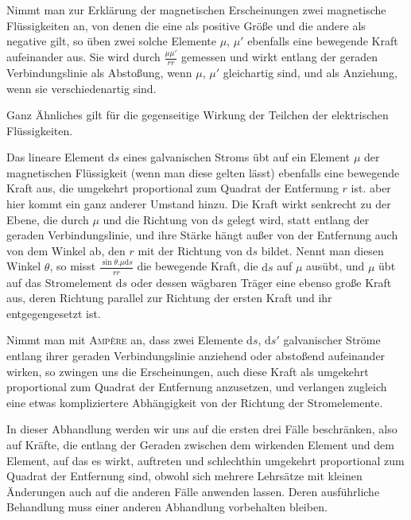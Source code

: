 Nimmt man zur Erklärung der magnetischen Erscheinungen zwei magnetische Flüssigkeiten an, von denen die eine als positive Größe und die andere als negative gilt, so üben zwei solche Elemente $\mu$, $\mu'$ ebenfalls eine bewegende Kraft aufeinander aus. Sie wird durch $\frac{\mu\mu'}{rr}$ gemessen und wirkt entlang der geraden Verbindungslinie als Abstoßung, wenn $\mu$, $\mu'$ gleichartig sind, und als Anziehung, wenn sie verschiedenartig sind.

Ganz Ähnliches gilt für die gegenseitige Wirkung der Teilchen der elektrischen Flüssigkeiten.

Das lineare Element $\mathrm{d}s$ eines galvanischen Stroms übt auf ein Element $\mu$ der magnetischen Flüssigkeit (wenn man diese gelten lässt) ebenfalls eine bewegende Kraft aus, die umgekehrt proportional zum Quadrat der Entfernung $r$ ist. aber hier kommt ein ganz anderer Umstand hinzu. Die Kraft wirkt senkrecht zu der Ebene, die durch $\mu$ und die Richtung von $\mathrm{d}s$ gelegt wird, statt entlang der geraden Verbindungslinie, und ihre Stärke hängt außer von der Entfernung auch von dem Winkel ab, den $r$ mit der Richtung von $\mathrm{d}s$ bildet. Nennt man diesen Winkel $\theta$, so misst $\frac{\sin\theta.\mu\mathrm{d}s}{rr}$ die bewegende Kraft, die $\mathrm{d}s$ auf $\mu$ ausübt, und $\mu$ übt auf das Stromelement $\mathrm{d}s$ oder dessen wägbaren Träger eine ebenso große Kraft aus, deren Richtung parallel zur Richtung der ersten Kraft und ihr entgegengesetzt ist.

Nimmt man mit \textsc{Ampère} an, dass zwei Elemente $\mathrm{d}s$, $\mathrm{d}s'$ galvanischer Ströme entlang ihrer geraden Verbindungslinie anziehend oder abstoßend aufeinander wirken, so zwingen uns die Erscheinungen, auch diese Kraft als umgekehrt proportional zum Quadrat der Entfernung anzusetzen, und verlangen zugleich eine etwas kompliziertere Abhängigkeit von der Richtung der Stromelemente.

In dieser Abhandlung werden wir uns auf die ersten drei Fälle beschränken, also auf Kräfte, die entlang der Geraden zwischen dem wirkenden Element und dem Element, auf das es wirkt, auftreten und schlechthin umgekehrt proportional zum Quadrat der Entfernung sind, obwohl sich mehrere Lehrsätze mit kleinen Änderungen auch auf die anderen Fälle anwenden lassen. Deren ausführliche Behandlung muss einer anderen Abhandlung vorbehalten bleiben.

